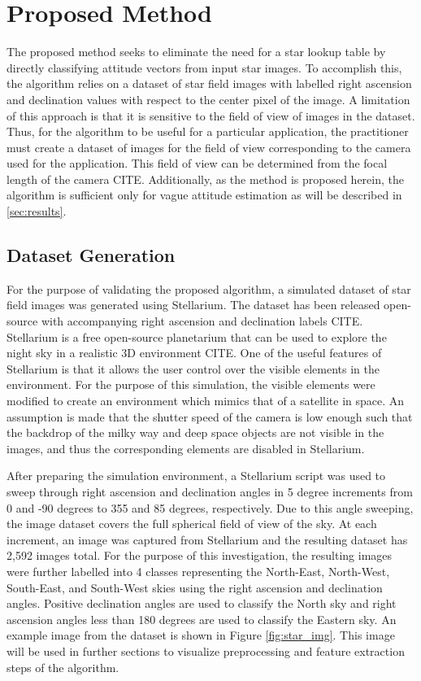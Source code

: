 \documentclass[10pt,twocolumn,letterpaper]{article}
\begin{document}
\section{Proposed Method}
\label{sec:method}

The proposed method seeks to eliminate the need for a star lookup table by directly classifying attitude vectors from input star images. To accomplish this, the algorithm relies on a dataset of star field images with labelled right ascension and declination values with respect to the center pixel of the image. A limitation of this approach is that it is sensitive to the field of view of images in the dataset. Thus, for the algorithm to be useful for a particular application, the practitioner must create a dataset of images for the field of view corresponding to the camera used for the application. This field of view can be determined from the focal length of the camera CITE. Additionally, as the method is proposed herein, the algorithm is sufficient only for vague attitude estimation as will be described in \ref{sec:results}.

\subsection{Dataset Generation}

For the purpose of validating the proposed algorithm, a simulated dataset of star field images was generated using Stellarium. The dataset has been released open-source with accompanying right ascension and declination labels CITE. Stellarium is a free open-source planetarium that can be used to explore the night sky in a realistic 3D environment CITE. One of the useful features of Stellarium is that it allows the user control over the visible elements in the environment. For the purpose of this simulation, the visible elements were modified to create an environment which mimics that of a satellite in space. An assumption is made that the shutter speed of the camera is low enough such that the backdrop of the milky way and deep space objects are not visible in the images, and thus the corresponding elements are disabled in Stellarium.

After preparing the simulation environment, a Stellarium script was used to sweep through right ascension and declination angles in 5 degree increments from 0 and -90 degrees to 355 and 85 degrees, respectively. Due to this angle sweeping, the image dataset covers the full spherical field of view of the sky. At each increment, an image was captured from Stellarium and the resulting dataset has 2,592 images total. For the purpose of this investigation, the resulting images were further labelled into 4 classes representing the North-East, North-West, South-East, and South-West skies using the right ascension and declination angles. Positive declination angles are used to classify the North sky and right ascension angles less than 180 degrees are used to classify the Eastern sky. An example image from the dataset is shown in Figure \ref{fig:star_img}. This image will be used in further sections to visualize preprocessing and feature extraction steps of the algorithm.
\end{document}
